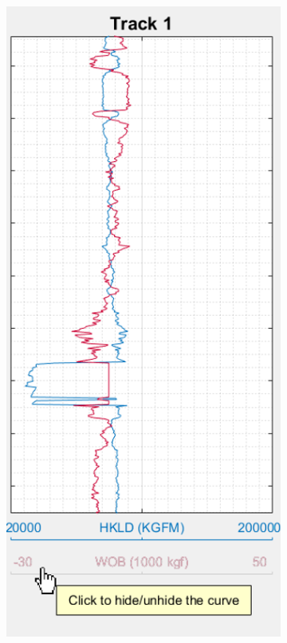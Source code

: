 \documentclass[12pt,a4paper,oneside]{report}
\begin{document}
\begin{figure}[H]
\centering
  \begin{subfigure}[b]{0.31\textwidth}
    \includegraphics[width=\textwidth]{fig/1_hide.png}

\end{subfigure}
\end{figure}
\end{document}
